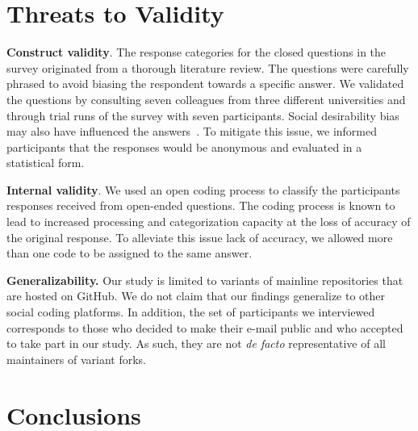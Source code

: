 \section{Threats to Validity}

\noindent \textbf{Construct validity}.
The response categories for the closed questions in the survey originated from a thorough literature review.
The questions were carefully phrased to avoid biasing the respondent towards a specific answer. We validated the questions by consulting seven colleagues from three different universities and through trial runs of the survey with seven participants.
Social desirability bias may also have influenced the answers~\cite{Furnham:1986}. To mitigate this issue, we informed participants that the responses would be anonymous and evaluated in a statistical form.

\noindent \textbf{Internal validity}. We used an open coding process to classify the participants responses received from open-ended questions. The coding process is known to lead to increased processing and categorization capacity at the loss of accuracy of the original response. To alleviate this issue lack of accuracy, we allowed more than one code to be assigned to the same answer.

\noindent \textbf{Generalizability.} Our study is limited to variants of mainline repositories that are hosted on GitHub. We do not claim that our findings generalize to other social coding platforms.
In addition, the set of participants we interviewed corresponds to those who decided to make their e-mail public and who accepted to take part in our study. As such, they are not {\em de facto} representative of all maintainers of variant forks.

\section{Conclusions}


